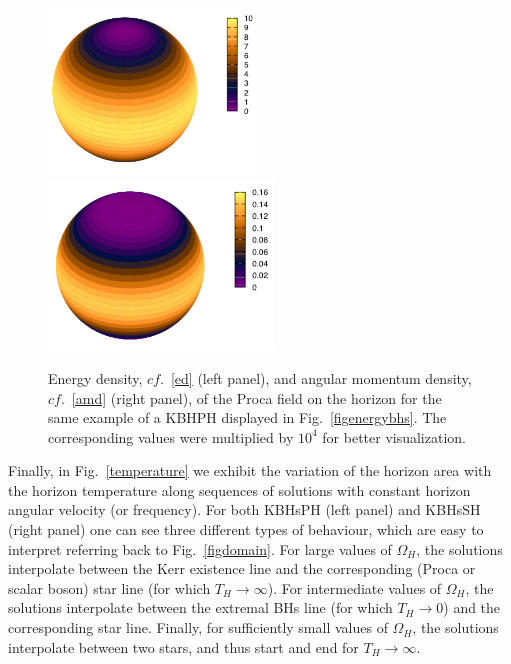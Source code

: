 \begin{figure}[h!]
  \begin{center}
    \includegraphics[width=5.5cm]{papers/Proca/Ttr-horizon.pdf}\qquad \qquad 
      \includegraphics[width=6.0cm]{papers/Proca/T34-horizon.pdf}
  \end{center}
  \caption{Energy density, $cf.$~\eqref{ed} (left panel), and angular momentum density, $cf.$~\eqref{amd}  (right panel),  of the Proca field on the horizon for the same example of a KBHPH displayed in Fig.~\ref{figenergybhs}. The corresponding values were multiplied by $10^4$ for better visualization.}
  \label{horizoned}
\end{figure}


Finally, in Fig.~\ref{temperature} we exhibit the variation of the horizon area with the horizon temperature along sequences of solutions with constant horizon angular velocity (or frequency).
For both KBHsPH (left panel) and KBHsSH (right panel) one can see three different types of behaviour, which are easy to interpret referring back to Fig.~\ref{figdomain}.
For large values of $\Omega_H$, the solutions interpolate between the Kerr existence line and the corresponding (Proca or scalar boson) star line (for which $T_H\rightarrow \infty$).
For intermediate values of $\Omega_H$, the solutions interpolate between the extremal BHs line (for which $T_H\rightarrow 0$) and the corresponding star line.
Finally, for sufficiently small values of $\Omega_H$, the solutions interpolate between two stars, and thus start and end for $T_H\rightarrow \infty$.


